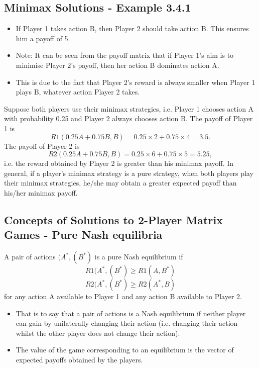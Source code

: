 \documentclass[]{article}
\begin{document}
	\subsection{Minimax Solutions - Example 3.4.1}
	\begin{itemize}
		\item If Player 1 takes action B, then Player 2 should take action B.
		This ensures him a payoff of 5.
		\item Note: It can be seen from the payoff matrix that if Player 1’s aim
		is to minimise Player 2’s payoff, then her action B dominates
		action A.
		\item This is due to the fact that Player 2’s reward is always smaller
		when Player 1 plays B, whatever action Player 2 takes.
	\end{itemize}
	
	Suppose both players use their minimax strategies, i.e. Player 1
	chooses action A with probability 0.25 and Player 2 always chooses
	action B.
	The payoff of Player 1 is
	\[R1(0.25A + 0.75B, B) = 0.25 × 2 + 0.75 × 4 = 3.5.\]
	The payoff of Player 2 is
	\[R2(0.25A + 0.75B, B) = 0.25 × 6 + 0.75 × 5 = 5.25,\] i.e. the
	reward obtained by Player 2 is greater than his minimax payoff.
	In general, if a player’s minimax strategy is a pure strategy, when
	both players play their minimax strategies, he/she may obtain a
	greater expected payoff than his/her minimax payoff.
	\subsection{Concepts of Solutions to 2-Player Matrix Games - Pure
		Nash equilibria}
	A pair of actions $(A^{\ast},(B^{\ast})$ is a pure Nash equilibrium if
\[	R1(A^{\ast},(B^{\ast}) \geq R1(A, B^{\ast}) \]
\[	R2(A^{\ast},(B^{\ast}) \geq R2(A^{\ast}, B) \]
	for any action A available to Player 1 and any action B available
	to Player 2.
	\begin{itemize}
		\item That is to say that a pair of actions is a Nash equilibrium if neither
		player can gain by unilaterally changing their action (i.e. changing
		their action whilst the other player does not change their action).
		\item The value of the game corresponding to an equilibrium is the
		vector of expected payoffs obtained by the players.
	\end{itemize}
	
\end{document}
